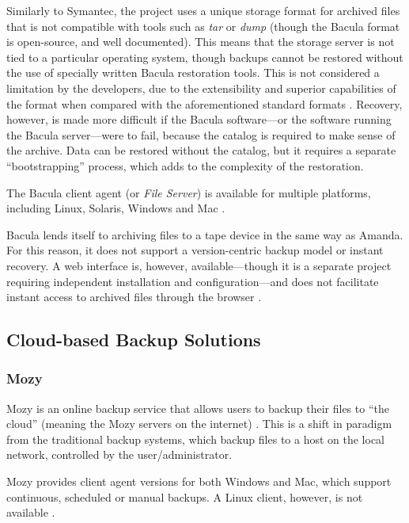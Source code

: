 Similarly to Symantec, the project uses a unique storage format for archived
files that is not compatible with tools such as \emph{tar} or \emph{dump}
(though the Bacula format is open-source, and well documented). This means that
the storage server is not tied to a particular operating system, though backups
cannot be restored without the use of specially written Bacula restoration
tools. This is not considered a limitation by the developers, due to the
extensibility and superior capabilities of the format when compared with the
aforementioned standard formats \cite{Bacula-about}. Recovery, however, is made
more difficult if the Bacula software---or the software running the Bacula
server---were to fail, because the catalog is required to make sense of the
archive. Data can be restored without the catalog, but it requires a separate
``bootstrapping'' process, which adds to the complexity of the restoration.

The Bacula client agent (or \emph{File Server}) is available for multiple platforms,
including Linux, Solaris, Windows and Mac \cite{Bacula-features}.

Bacula lends itself to archiving files to a tape device in the same way as
Amanda.  For this reason, it does not support a version-centric backup model or
instant recovery. A web interface is, however, available---though it is
a separate project requiring independent installation and configuration---and
does not facilitate instant access to archived files through the
browser \cite{Bacula-about}.

\subsection{Cloud-based Backup Solutions}

\subsubsection{Mozy}

Mozy is an online backup service that allows users to backup their files to
``the cloud'' (meaning the Mozy servers on the internet) \cite{Mozy}. This is
a shift in paradigm from the traditional backup systems, which backup files to
a host on the local network, controlled by the user/administrator. 

Mozy provides client agent versions for both Windows and Mac, which support
continuous, scheduled or manual backups. A Linux client, however, is not
available \cite{Mozy}.


